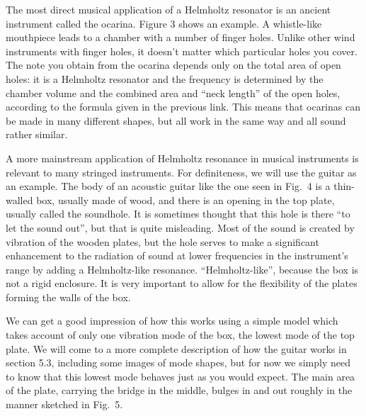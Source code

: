 
  The most direct musical application of a Helmholtz resonator is an ancient 
  instrument called the ocarina. Figure 3 shows an example. A whistle-like 
  mouthpiece leads to a chamber with a number of finger holes. Unlike other 
  wind instruments with finger holes, it doesn't matter which particular holes 
  you cover. The note you obtain from the ocarina depends only on the total 
  area of open holes: it is a Helmholtz resonator and the frequency is 
  determined by the chamber volume and the combined area and ``neck length'' of 
  the open holes, according to the formula given in the previous link. This 
  means that ocarinas can be made in many different shapes, but all work in the 
  same way and all sound rather similar. 


  A more mainstream application of Helmholtz resonance in musical instruments 
  is relevant to many stringed instruments. For definiteness, we will use the 
  guitar as an example. The body of an acoustic guitar like the one seen in 
  Fig.\ 4 is a thin-walled box, usually made of wood, and there is an opening 
  in the top plate, usually called the soundhole. It is sometimes thought that 
  this hole is there ``to let the sound out'', but that is quite misleading. 
  Most of the sound is created by vibration of the wooden plates, but the hole 
  serves to make a significant enhancement to the radiation of sound at lower 
  frequencies in the instrument's range by adding a Helmholtz-like resonance. 
  ``Helmholtz-like'', because the box is not a rigid enclosure. It is very 
  important to allow for the flexibility of the plates forming the walls of the 
  box. 


  We can get a good impression of how this works using a simple model which 
  takes account of only one vibration mode of the box, the lowest mode of the 
  top plate. We will come to a more complete description of how the guitar 
  works in section 5.3, including some images of mode shapes, but for now we 
  simply need to know that this lowest mode behaves just as you would expect. 
  The main area of the plate, carrying the bridge in the middle, bulges in and 
  out roughly in the manner sketched in Fig.\ 5. 

